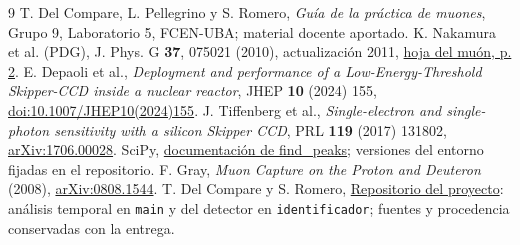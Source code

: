 \documentclass[10pt,a4paper]{article}
\begin{document}
\vspace{1mm}
{\small
\begin{thebibliography}{9}\setlength{\itemsep}{1pt}
 T. Del Compare, L. Pellegrino y S. Romero, \emph{Guía de la práctica de muones}, Grupo 9, Laboratorio 5, FCEN-UBA; material docente aportado.
 K. Nakamura et al. (PDG), J. Phys. G \textbf{37}, 075021 (2010), actualización 2011, \href{https://pdg.lbl.gov/2011/listings/rpp2011-list-muon.pdf}{hoja del muón, p. 2}.
 E. Depaoli et al., \emph{Deployment and performance of a Low-Energy-Threshold Skipper-CCD inside a nuclear reactor}, JHEP \textbf{10} (2024) 155, \href{https://doi.org/10.1007/JHEP10(2024)155}{doi:10.1007/JHEP10(2024)155}.
 J. Tiffenberg et al., \emph{Single-electron and single-photon sensitivity with a silicon Skipper CCD}, PRL \textbf{119} (2017) 131802, \href{https://arxiv.org/abs/1706.00028}{arXiv:1706.00028}.
 SciPy, \href{https://docs.scipy.org/doc/scipy/reference/generated/scipy.signal.find_peaks.html}{documentación de find\_peaks}; versiones del entorno fijadas en el repositorio.
 F. Gray, \emph{Muon Capture on the Proton and Deuteron} (2008), \href{https://arxiv.org/abs/0808.1544}{arXiv:0808.1544}.
 T. Del Compare y S. Romero, \href{https://github.com/santii-romero/Deteccion-de-muones}{Repositorio del proyecto}: análisis temporal en \texttt{main} y del detector en \texttt{identificador}; fuentes y procedencia conservadas con la entrega.
\end{thebibliography}}
\end{document}
